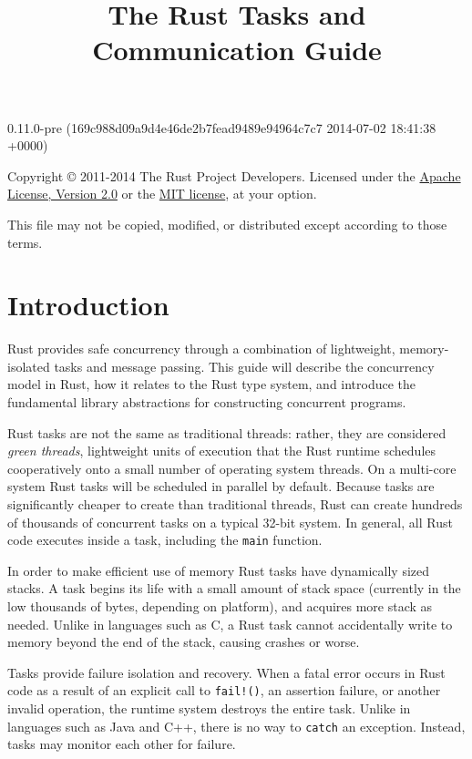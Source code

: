 \documentclass[]{article}
\title{The Rust Tasks and Communication Guide}
\begin{document}
\maketitle

0.11.0-pre (169c988d09a9d4e46de2b7fead9489e94964c7c7 2014-07-02 18:41:38 +0000)

Copyright © 2011-2014 The Rust Project Developers. Licensed under the
\href{http://www.apache.org/licenses/LICENSE-2.0}{Apache License,
Version 2.0} or the \href{http://opensource.org/licenses/MIT}{MIT
license}, at your option.

This file may not be copied, modified, or distributed except according
to those terms.

{
\hypersetup{linkcolor=black}
\setcounter{tocdepth}{3}
\tableofcontents
}
\section{Introduction}\label{introduction}

Rust provides safe concurrency through a combination of lightweight,
memory-isolated tasks and message passing. This guide will describe the
concurrency model in Rust, how it relates to the Rust type system, and
introduce the fundamental library abstractions for constructing
concurrent programs.

Rust tasks are not the same as traditional threads: rather, they are
considered \emph{green threads}, lightweight units of execution that the
Rust runtime schedules cooperatively onto a small number of operating
system threads. On a multi-core system Rust tasks will be scheduled in
parallel by default. Because tasks are significantly cheaper to create
than traditional threads, Rust can create hundreds of thousands of
concurrent tasks on a typical 32-bit system. In general, all Rust code
executes inside a task, including the \texttt{main} function.

In order to make efficient use of memory Rust tasks have dynamically
sized stacks. A task begins its life with a small amount of stack space
(currently in the low thousands of bytes, depending on platform), and
acquires more stack as needed. Unlike in languages such as C, a Rust
task cannot accidentally write to memory beyond the end of the stack,
causing crashes or worse.

Tasks provide failure isolation and recovery. When a fatal error occurs
in Rust code as a result of an explicit call to \texttt{fail!()}, an
assertion failure, or another invalid operation, the runtime system
destroys the entire task. Unlike in languages such as Java and C++,
there is no way to \texttt{catch} an exception. Instead, tasks may
monitor each other for failure.
\end{document}
